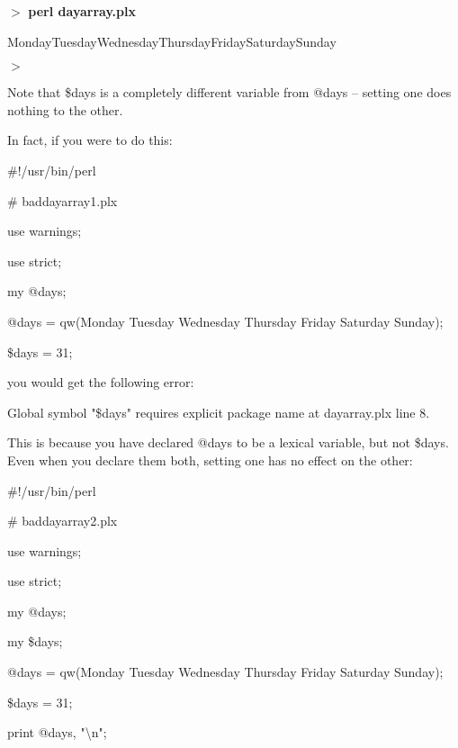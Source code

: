 \documentclass[a4paper,11pt]{book}
\begin{document}
\noindent 

\noindent $>$ \textbf{perl dayarray.plx}

\noindent MondayTuesdayWednesdayThursdayFridaySaturdaySunday

\noindent $>$

\noindent 

\noindent Note that \$days is a completely different variable from @days -- setting one does nothing to the other.

\noindent In fact, if you were to do this:

\noindent 

\noindent 

\noindent \#!/usr/bin/perl

\noindent \# baddayarray1.plx

\noindent use warnings;

\noindent use strict;

\noindent 

\noindent my @days;

\noindent @days = qw(Monday Tuesday Wednesday Thursday Friday Saturday Sunday);

\noindent \$days = 31;

\noindent 

\noindent 

\noindent you would get the following error:

\noindent 

\noindent Global symbol "\$days" requires explicit package name at dayarray.plx line 8.

\noindent 

\noindent This is because you have declared @days to be a lexical variable, but not \$days. Even when you declare them both, setting one has no effect on the other:

\noindent 

\noindent \#!/usr/bin/perl

\noindent \# baddayarray2.plx

\noindent use warnings;

\noindent use strict;

\noindent 

\noindent my @days;

\noindent my \$days;

\noindent @days = qw(Monday Tuesday Wednesday Thursday Friday Saturday Sunday);

\noindent \$days = 31;

\noindent print @days, "\textbackslash n";
\end{document}
